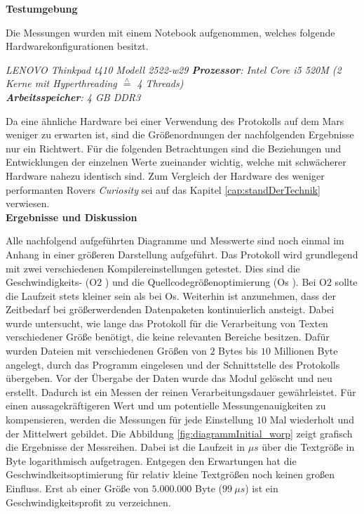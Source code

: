\textbf{Testumgebung}

Die Messungen wurden mit einem Notebook aufgenommen, welches
folgende Hardwarekonfigurationen besitzt.

\textit{
	LENOVO Thinkpad t410 Modell 2522-w29 \newline
	\textbf{Prozessor}: Intel Core i5 520M (2 Kerne mit Hyperthreading $\stackrel{\wedge}=$ 4 Threads)\\
	\textbf{Arbeitsspeicher}: 4 GB DDR3	
	}

Da eine ähnliche Hardware bei einer Verwendung des Protokolls auf dem Mars
weniger zu erwarten ist, sind die Größenordnungen der nachfolgenden Ergebnisse
nur ein Richtwert. Für die folgenden Betrachtungen sind die Beziehungen und
Entwicklungen der einzelnen Werte zueinander wichtig, welche mit schwächerer
Hardware nahezu identisch sind. Zum Vergleich der Hardware des weniger
performanten Rovers \textit{Curiosity} sei auf das Kapitel
\ref{cap:standDerTechnik} verwiesen.
\\

\textbf{Ergebnisse und Diskussion}

Alle nachfolgend aufgeführten Diagramme und Messwerte sind noch einmal im Anhang
in einer größeren Darstellung aufgeführt.\newline
Das Protokoll wird grundlegend mit zwei verschiedenen Kompilereinstellungen
getestet. Dies sind die Geschwindigkeits- (\glqq O$2$ \grqq) und die
Quellcodegrößenoptimierung (\glqq Os \grqq).
\newline
Bei O$2$ sollte die Laufzeit stets kleiner sein als bei Os. Weiterhin ist
anzunehmen, dass der Zeitbedarf bei größerwerdenden Datenpaketen kontinuierlich
ansteigt.
\newline
Dabei wurde untersucht, wie lange das Protokoll für die Verarbeitung von Texten
verschiedener Größe benötigt, die keine relevanten Bereiche besitzen. Dafür
wurden Dateien mit verschiedenen Größen von $2$ Bytes bis $10$ Millionen Byte 
angelegt, durch das Programm eingelesen und der Schnittstelle des Protokolls
übergeben. Vor der Übergabe der Daten wurde das Modul gelöscht und neu erstellt.
Dadurch ist ein Messen der reinen Verarbeitungsdauer gewährleistet. Für einen
aussagekräftigeren Wert und um potentielle Messungenauigkeiten zu kompensieren,
werden die Messungen für jede Einstellung $10$ Mal wiederholt und der Mittelwert
gebildet.
\newline
Die Abbildung \ref{fig:diagrammInitial_worp} zeigt grafisch die Ergebnisse der
Messreihen. Dabei ist die
Laufzeit in $\mu s$ über die Textgröße in Byte logarithmisch aufgetragen.
Entgegen den Erwartungen hat die Geschwindkeitsoptimierung für relativ
kleine Textgrößen noch keinen großen Einfluss. Erst ab einer Größe von
$5.000.000$ Byte ($99\ \mu s$) ist ein Geschwindigkeitsprofit zu
verzeichnen.

